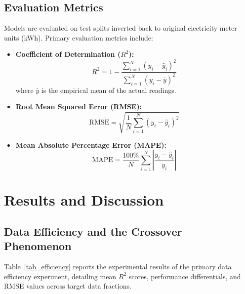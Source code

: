 \documentclass[conference]{IEEEtran}
\begin{document}
\subsection{Evaluation Metrics}
Models are evaluated on test splits inverted back to original electricity meter units (kWh). Primary evaluation metrics include:

\begin{itemize}
    \item \textbf{Coefficient of Determination ($R^2$):}
    \begin{equation}
    R^2 = 1 - \frac{\sum_{i=1}^{N} (y_i - \hat{y}_i)^2}{\sum_{i=1}^{N} (y_i - \bar{y})^2}
    \label{eq_r2}
    \end{equation}
    where $\bar{y}$ is the empirical mean of the actual readings.

    \item \textbf{Root Mean Squared Error (RMSE):}
    \begin{equation}
    \text{RMSE} = \sqrt{\frac{1}{N} \sum_{i=1}^{N} (y_i - \hat{y}_i)^2}
    \label{eq_rmse}
    \end{equation}

    \item \textbf{Mean Absolute Percentage Error (MAPE):}
    \begin{equation}
    \text{MAPE} = \frac{100\%}{N} \sum_{i=1}^{N} \left| \frac{y_i - \hat{y}_i}{y_i} \right|
    \label{eq_mape}
    \end{equation}
\end{itemize}

\section{Results and Discussion}
\subsection{Data Efficiency and the Crossover Phenomenon}
Table~\ref{tab_efficiency} reports the experimental results of the primary data efficiency experiment, detailing mean $R^2$ scores, performance differentials, and RMSE values across target data fractions.
\end{document}
